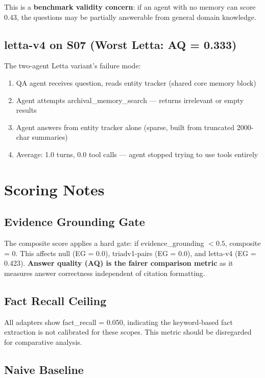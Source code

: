 \documentclass[11pt,a4paper]{article}
\begin{document}
This is a \textbf{benchmark validity concern}: if an agent with no memory can score 0.43, the questions may be partially answerable from general domain knowledge.

\subsection{letta-v4 on S07 (Worst Letta: AQ = 0.333)}

The two-agent Letta variant's failure mode:
\begin{enumerate}[nosep]
  \item QA agent receives question, reads entity tracker (shared core memory block)
  \item Agent attempts archival\_memory\_search --- returns irrelevant or empty results
  \item Agent answers from entity tracker alone (sparse, built from truncated 2000-char summaries)
  \item Average: 1.0 turns, 0.0 tool calls --- agent stopped trying to use tools entirely
\end{enumerate}

\section{Scoring Notes}

\subsection{Evidence Grounding Gate}

The composite score applies a hard gate: if evidence\_grounding $< 0.5$, composite = 0.
This affects null (EG = 0.0), triadv1-pairs (EG = 0.0), and letta-v4 (EG = 0.423).
\textbf{Answer quality (AQ) is the fairer comparison metric} as it measures answer correctness independent of citation formatting.

\subsection{Fact Recall Ceiling}

All adapters show fact\_recall = 0.050, indicating the keyword-based fact extraction is not calibrated for these scopes.
This metric should be disregarded for comparative analysis.

\subsection{Naive Baseline}
\end{document}
